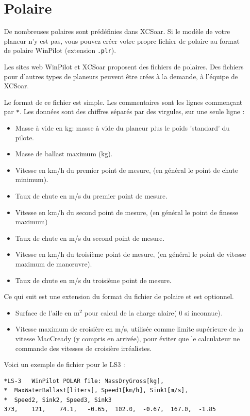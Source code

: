 \section{Polaire} \label{sec:glide-polar}

De nombreuses polaires sont prédéfinies dans XCSoar. Si le modèle de votre planeur n'y est pas, vous pouvez créer votre propre fichier de polaire au format de polaire WinPilot (extension \verb|.plr|).

Les sites web WinPilot et XCSoar proposent des fichiers de polaires. Des fichiers pour d'autres types de planeurs peuvent être crées à la demande, à l'équipe de XCSoar.

Le format de ce fichier est simple. Les commentaires sont les lignes commençant par \verb|*|. Les données sont des chiffres séparés par des virgules, sur une seule ligne :
\begin{itemize}
\item Masse à vide en kg: masse à vide du planeur plus le poids 'standard' du pilote.
\item Masse de ballast maximum (kg).
\item Vitesse en km/h du premier point de mesure, (en général le point de chute minimum).
\item Taux de chute en m/s du premier point de mesure.
\item Vitesse en km/h du second point de mesure, (en général le point de finesse maximum)
\item Taux de chute en m/s du second point de mesure.
\item Vitesse en km/h du troisième point de mesure, (en général le point de vitesse maximum de manœuvre).
\item Taux de chute en m/s du troisième point de mesure.
\end{itemize}
Ce qui suit est une extension du format du fichier de polaire et est optionnel.
\begin{itemize}
\item Surface de l'aile en m$^2$ pour calcul de la charge alaire( 0 si inconnue).
\item Vitesse maximum de croisière en m/s, utilisée comme limite supérieure
  de la vitesse MacCready (y compris en arrivée), pour éviter que le
  calculateur ne commande des vitesses de croisière irréalistes.
\end{itemize}

Voici un exemple de fichier pour le LS3 :
\begin{verbatim}
*LS-3	WinPilot POLAR file: MassDryGross[kg], 
*  MaxWaterBallast[liters], Speed1[km/h], Sink1[m/s], 
*  Speed2, Sink2, Speed3, Sink3  	
373,	121,	74.1,	-0.65,	102.0,	-0.67,	167.0,	-1.85
\end{verbatim}

